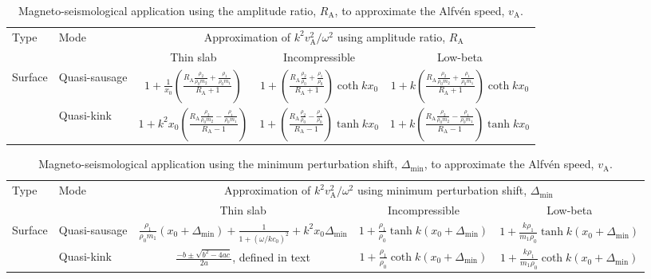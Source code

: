 \documentclass[namedreferences]{solarphysics}
\numberwithin{equation}{section}
\begin{document}
\begin{article}
\begin{landscape}

\begin{table}
\caption{Magneto-seismological application using the amplitude ratio, $R_\textrm{A}$, to approximate the Alfv\'{e}n speed, $v_\textrm{A}$.}
\begin{tabular}{llccc}
  \toprule
Type & Mode & \multicolumn{3}{c}{Approximation of $k^2v_\textrm{A}^2 / \omega^2$ using amplitude ratio, $R_\textrm{A}$} \\
\cmidrule(lr){3-5}
	 &	    & \multicolumn{1}{c}{Thin slab} & \multicolumn{1}{c}{Incompressible} & \multicolumn{1}{c}{Low-beta} \\
  \midrule
\multirow{2}{*}{Surface} & Quasi-sausage & $ 1 + \frac{1}{x_0}\left(\frac{R_\textrm{A}\frac{\rho_2}{\rho_0m_2} + \frac{\rho_1}{\rho_0m_1}}{R_\textrm{A} + 1}\right) $ & $ 1 + \left( \frac{R_\textrm{A} \frac{\rho_2}{\rho_0} + \frac{\rho_1}{\rho_0}}{R_\textrm{A} + 1} \right) \coth{kx_0} $ & $ 1 + k \left( \frac{ R_\textrm{A}\frac{\rho_2}{\rho_0m_2} + \frac{\rho_1}{\rho_0m_1}}{R_\textrm{A} + 1} \right) \coth{kx_0} $ \\
						   & Quasi-kink	   & $ 1 + k^2x_0\left(\frac{R_\textrm{A}\frac{\rho_2}{\rho_0m_2} - \frac{\rho_1}{\rho_0m_1}}{R_\textrm{A} - 1}\right) $ & $ 1 + \left( \frac{R_\textrm{A} \frac{\rho_2}{\rho_0} - \frac{\rho_1}{\rho_0}}{R_\textrm{A} - 1} \right) \tanh{kx_0} $ & $ 1 + k \left( \frac{ R_\textrm{A}\frac{\rho_2}{\rho_0m_2} - \frac{\rho_1}{\rho_0m_1}}{R_\textrm{A} - 1} \right) \tanh{kx_0} $ \\
  \bottomrule
\end{tabular} \label{table: amp ratio}
\end{table}


\begin{table}
\caption{Magneto-seismological application using the minimum perturbation shift, $\Delta_\textrm{min}$, to approximate the Alfv\'{e}n speed, $v_\textrm{A}$.}
\begin{tabular}{llccc}
  \toprule
Type & Mode & \multicolumn{3}{c}{Approximation of $k^2v_\textrm{A}^2 / \omega^2$ using minimum perturbation shift, $\Delta_\textrm{min}$} \\
\cmidrule(lr){3-5}
	 &	    & Thin slab & Incompressible & Low-beta \\
  \midrule
\multirow{2}{*}{Surface} & Quasi-sausage & $ \frac{\rho_1}{\rho_0m_1}(x_0 + \Delta_\textrm{min}) + \frac{1}{1 + (\omega / kc_0)^2} + k^2x_0\Delta_\textrm{min} $ & $ 1 + \frac{\rho_1}{\rho_0}\tanh{k(x_0 + \Delta_\textrm{min})} $ & $ 1 + \frac{k\rho_1}{m_1\rho_0}\tanh{k(x_0 + \Delta_\textrm{min})} $ \\
						   & Quasi-kink	   & $\frac{-b \pm \sqrt{b^2 - 4ac}}{2a}$, defined in text & $ 1 + \frac{\rho_1}{\rho_0}\coth{k(x_0 + \Delta_\textrm{min})} $ & $ 1 + \frac{k\rho_1}{m_1\rho_0}\coth{k(x_0 + \Delta_\textrm{min})} $ \\
  \bottomrule
\end{tabular} \label{table: shift in min pert}
\end{table}


\end{landscape}
\end{article}
\end{document}

